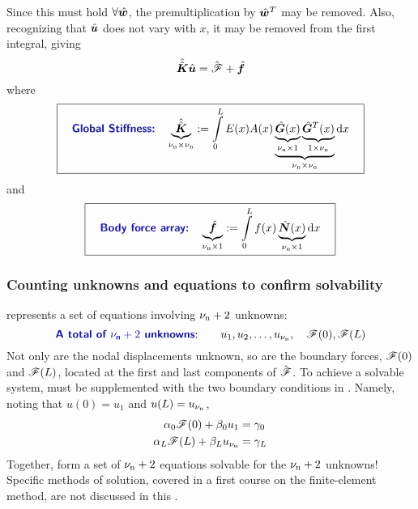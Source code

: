Since this must hold $\forall\hat{\bm{w}}$, the premultiplication by $\hat{\bm{w}}^T$ may be removed. Also, recognizing that $\hat{\bm{u}}$ does not vary with $x$, it may be removed from the first integral, giving
\begin{equation}
\hat{\hat{\bm{K}}}\hat{\bm{u}}
=
\hat{\bm{\mathscr{F}}}  
+  \hat{\bm{f}}
\label{eq:LinearBarWeakFormDiscr}
\end{equation}
where
\begin{equation}
\boxit{\quad
\text{\Defn{Global Stiffness:}}\quad
  \underbrace{\AArray{K}}_{\numnodes\by\numnodes}\definedEqual\int\limits_0^L E(x)A(x)  \underbrace{\underbrace{\gradNBFa(x)}_{\numnodes\by1} \underbrace{\gradNBFa^T(x)}_{1\by\numnodes}}_{\numnodes\by\numnodes} \dd x
\quad}
\label{eq:linearBarGlobalStiffness}
\end{equation}
and
\begin{equation}
\boxit{\quad
\text{\Defn{Body force array:}}\quad
  \underbrace{\Array{f}}_{\numnodes\by1}
\definedEqual
\int\limits_0^L f(x)\underbrace{\NBFa(x)}_{\numnodes\by1}\dd x
\quad}
\label{eq:linearBarBodyForceArray}
\end{equation}

\subsubsection{Counting unknowns and equations to confirm solvability}
 represents a set of \numnodes equations involving ${\nu_\text{n}}+2$ unknowns: 
\begin{equation}
 \text{\Defn{A total of $\numnodes+2$ unknowns}:}\qquad u_1, u_2, \ldots, u_\numnodes,\quad \tractionForce(0), \tractionForce(L)
\end{equation}
Not only are the nodal displacements unknown, so are the boundary forces, $\mathscr{F}(0)$ and $\mathscr{F}(L)$, located at the first and last components of $\hat{\bm{\mathscr{F}}}$.  To achieve a solvable system,  must be supplemented with the two boundary conditions in .  Namely, noting that $u(0)=u_1$ and $u(L)=u_{\nu_\text{n}}$,
\begin{equation}
\begin{aligned}
\alpha_0 \mathscr{F}(0)+\beta_0 u_1&=\gamma_0 \\
\alpha_L \mathscr{F}(L)+\beta_L u_{\nu_\text{n}}&=\gamma_L 
\end{aligned}
\label{eq:LinearBarStrongFormBCs}
\end{equation}
Together,  form a set of ${\nu_\text{n}}+2$ equations solvable for the ${\nu_\text{n}}+2$ unknowns!  Specific methods of solution, covered in a first course on the finite-element method, are not discussed in this \manuscript.


